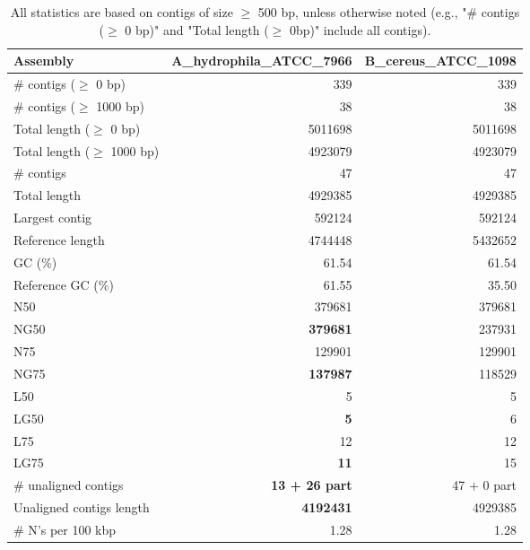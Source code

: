 \documentclass[12pt,a4paper]{article}
\begin{document}
\begin{table}[ht]
\begin{center}
\caption{All statistics are based on contigs of size $\geq$ 500 bp, unless otherwise noted (e.g., "\# contigs ($\geq$ 0 bp)" and "Total length ($\geq$ 0bp)" include all contigs).}
\begin{tabular}{|l*{2}{|r}|}
\hline
Assembly & A\_hydrophila\_ATCC\_7966 & B\_cereus\_ATCC\_1098 \\ \hline
\# contigs ($\geq$ 0 bp) & 339 & 339 \\ \hline
\# contigs ($\geq$ 1000 bp) & 38 & 38 \\ \hline
Total length ($\geq$ 0 bp) & 5011698 & 5011698 \\ \hline
Total length ($\geq$ 1000 bp) & 4923079 & 4923079 \\ \hline
\# contigs & 47 & 47 \\ \hline
Total length & 4929385 & 4929385 \\ \hline
Largest contig & 592124 & 592124 \\ \hline
Reference length & 4744448 & 5432652 \\ \hline
GC (\%) & 61.54 & 61.54 \\ \hline
Reference GC (\%) & 61.55 & 35.50 \\ \hline
N50 & 379681 & 379681 \\ \hline
NG50 & {\bf 379681} & 237931 \\ \hline
N75 & 129901 & 129901 \\ \hline
NG75 & {\bf 137987} & 118529 \\ \hline
L50 & 5 & 5 \\ \hline
LG50 & {\bf 5} & 6 \\ \hline
L75 & 12 & 12 \\ \hline
LG75 & {\bf 11} & 15 \\ \hline
\# unaligned contigs & {\bf 13 + 26 part} & 47 + 0 part \\ \hline
Unaligned contigs length & {\bf 4192431} & 4929385 \\ \hline
\# N's per 100 kbp & 1.28 & 1.28 \\ \hline
\end{tabular}
\end{center}
\end{table}
\end{document}
